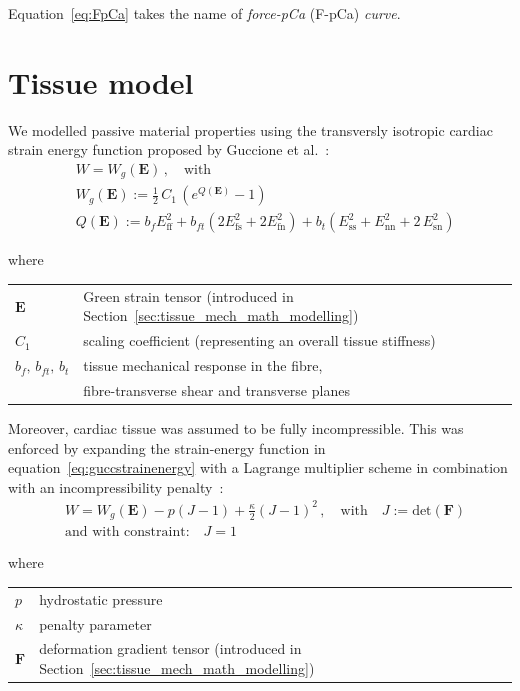 \noindent
Equation~\eqref{eq:FpCa} takes the name of \textit{force-pCa} (\acs{F-pCa}) \textit{curve}.


%
%
%
\section{Tissue model}\label{sec:tissuemodel}
We modelled passive material properties using the transversly isotropic cardiac strain energy function proposed by Guccione et al.~\cite{Guccione:1991}:
%
\begin{align}\label{eq:guccstrainenergy}
    &W = W_g(\mathbf{E})\,,\quad\text{with} \\
    &W_g(\mathbf{E}) := \frac{1}{2}\,C_1\,(e^{Q(\mathbf{E})}-1) \\
    &Q(\mathbf{E}) := b_f E_{\text{ff}}^2 + b_{ft}(2E_{\text{fs}}^2+2E_{\text{fn}}^2) + b_t(E_{\text{ss}}^2+E_{\text{nn}}^2+2\,E_{\text{sn}}^2)
\end{align}

\noindent
where

\vspace{0.2cm}
\begin{tabular}{ll}
    $\mathbf{E}$ & Green strain tensor (introduced in Section~\ref{sec:tissue_mech_math_modelling}) \\
    $C_1$ & scaling coefficient (representing an overall tissue stiffness) \\
    $b_f,\,b_{ft},\,b_t$ & tissue mechanical response in the fibre, \\ & fibre-transverse shear and transverse planes \\
\end{tabular}

\vspace{0.3cm}\noindent
Moreover, cardiac tissue was assumed to be fully incompressible. This was enforced by expanding the strain-energy function in equation~\eqref{eq:guccstrainenergy} with a Lagrange multiplier scheme in combination with an incompressibility penalty~\cite{Land:2015*b}:
%
\begin{align}\label{eq:landstrainenergy}
    &W = W_g(\mathbf{E}) - p(J - 1) + \frac{\kappa}{2}(J - 1)^2\,,\quad\text{with}\quad J:=\text{det}(\mathbf{F}) \\
    &\text{and with constraint:}\quad J=1
\end{align}

\noindent
where

\vspace{0.2cm}
\begin{tabular}{ll}
    $p$ & hydrostatic pressure \\
    $\kappa$ & penalty parameter \\
    $\mathbf{F}$ & deformation gradient tensor (introduced in Section~\ref{sec:tissue_mech_math_modelling})
\end{tabular}


